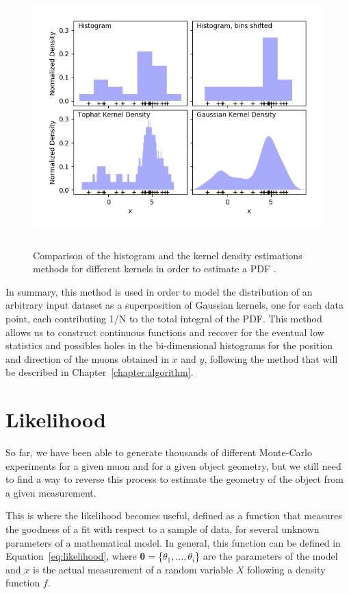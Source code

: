 \documentclass[a4paper, 11pt]{report}
\begin{document}
\begin{figure}[htbp]
\centering
\includegraphics[width=13cm, height=10cm]{figs/kernels.png}
\caption{Comparison of the histogram and the kernel density estimations methods for different kernels in order to estimate a PDF \cite{scikit}.}
\label{fig:KGR}
\end{figure}

In summary, this method is used in order to model the distribution of an arbitrary input dataset as a superposition of Gaussian kernels, one for each data point, each contributing 1/N to the total integral of the PDF. This method allows us to construct continuous functions and recover for the eventual low statistics and possibles holes in the bi-dimensional histograms for the position and direction of the muons obtained in $x$ and $y$, following the method that will be described in Chapter~\ref{chapter:algorithm}.

\section{Likelihood} \label{sec:Likelihood}

So far, we have been able to generate thousands of different Monte-Carlo experiments for a given muon and for a given object geometry, but we still need to find a way to reverse this process to estimate the geometry of the object from a given measurement. 

This is where the likelihood becomes useful, defined as a function that measures the goodness of a fit with respect to a sample of data, for several unknown parameters of a mathematical model. In general, this function can be defined in Equation~\ref{eq:likelihood}, where $\bm \theta = $\{$\theta_1, ..., \theta_i$\} are the parameters of the model and $x$ is the actual measurement of a random variable $X$ following a density function $f$.
\end{document}
